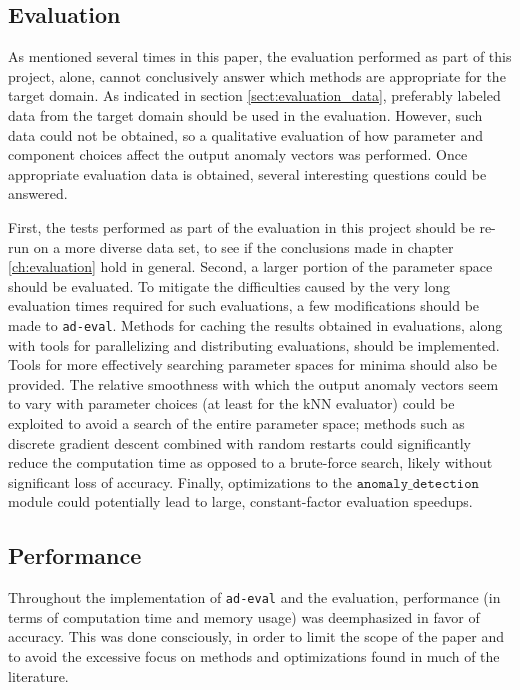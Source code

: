 \subsection{Evaluation}

As mentioned several times in this paper, the evaluation performed as part of this project, alone, cannot conclusively answer which methods are appropriate for the target domain. As indicated in section \ref{sect:evaluation_data}, preferably labeled data from the target domain should be used in the evaluation. However, such data could not be obtained, so a qualitative evaluation of how parameter and component choices affect the output anomaly vectors was performed. Once appropriate evaluation data is obtained, several interesting questions could be answered.

First, the tests performed as part of the evaluation in this project should be re-run on a more diverse data set, to see if the conclusions made in chapter \ref{ch:evaluation} hold in general. Second, a larger portion of the parameter space should be evaluated. To mitigate the difficulties caused by the very long evaluation times required for such evaluations, a few modifications should be made to \texttt{ad-eval}. Methods for caching the results obtained in evaluations, along with tools for parallelizing and distributing evaluations, should be implemented. Tools for more effectively searching parameter spaces for minima should also be provided. The relative smoothness with which the output anomaly vectors seem to vary with parameter choices (at least for the kNN evaluator) could be exploited to avoid a search of the entire parameter space; methods such as discrete gradient descent combined with random restarts could significantly reduce the computation time as opposed to a brute-force search, likely without significant loss of accuracy. Finally, optimizations to the $\texttt{anomaly\_detection}$ module could potentially lead to large, constant-factor evaluation speedups.

\subsection{Performance}

Throughout the implementation of \texttt{ad-eval} and the evaluation, performance (in terms of computation time and memory usage) was deemphasized in favor of accuracy. This was done consciously, in order to limit the scope of the paper and to avoid the excessive focus on methods and optimizations found in much of the literature.

